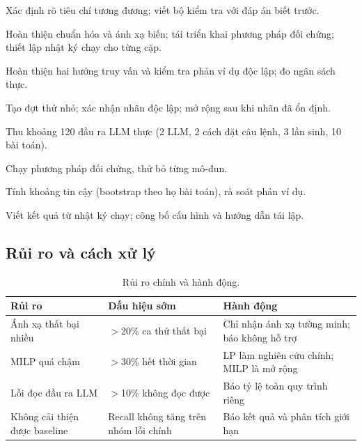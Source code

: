 \documentclass[11pt,a4paper]{article}
\theoremstyle{plain}
\theoremstyle{definition}
\theoremstyle{remark}
\begin{document}
\begin{description}[leftmargin=2.5em,labelsep=0.5em,style=nextline]
  \item[\textbf{Tuần 1--2.}]
  Xác định rõ tiêu chí tương đương; viết bộ kiểm tra với đáp án biết trước.
  \item[\textbf{Tuần 3--4.}]
  Hoàn thiện chuẩn hóa và ánh xạ biến; tái triển khai phương pháp đối chứng;
  thiết lập nhật ký chạy cho từng cặp.
  \item[\textbf{Tuần 5--6.}]
  Hoàn thiện hai hướng truy vấn và kiểm tra phản ví dụ độc lập; đo ngân sách thực.
  \item[\textbf{Tuần 7--8.}]
  Tạo đợt thử nhỏ; xác nhận nhãn độc lập; mở rộng sau khi nhãn đã ổn định.
  \item[\textbf{Tuần 9.}]
  Thu khoảng 120 đầu ra LLM thực (2 LLM, 2 cách đặt câu lệnh, 3 lần sinh, 10 bài toán).
  \item[\textbf{Tuần 10.}]
  Chạy phương pháp đối chứng, thử bỏ từng mô-đun.
  \item[\textbf{Tuần 11.}]
  Tính khoảng tin cậy (bootstrap theo họ bài toán), rà soát phản ví dụ.
  \item[\textbf{Tuần 12.}]
  Viết kết quả từ nhật ký chạy; công bố cấu hình và hướng dẫn tái lập.
\end{description}

\subsection{Rủi ro và cách xử lý}

\begin{table}[H]
\centering
\caption{Rủi ro chính và hành động.}
\label{tab:risk}
\small
\begin{tabularx}{\textwidth}{L{3cm} L{2.8cm} Y}
\toprule
\textbf{Rủi ro} & \textbf{Dấu hiệu sớm} & \textbf{Hành động} \\
\midrule
Ánh xạ thất bại nhiều
  & $>$20\% ca thử thất bại
  & Chỉ nhận ánh xạ tường minh; báo không hỗ trợ \\
MILP quá chậm
  & $>$30\% hết thời gian
  & LP làm nghiên cứu chính; MILP là mở rộng \\
Lỗi đọc đầu ra LLM
  & $>$10\% không đọc được
  & Báo tỷ lệ toàn quy trình riêng \\
Không cải thiện được baseline
  & Recall không tăng trên nhóm lỗi chính
  & Báo kết quả và phân tích giới hạn \\
\bottomrule
\end{tabularx}
\end{table}
\end{document}
